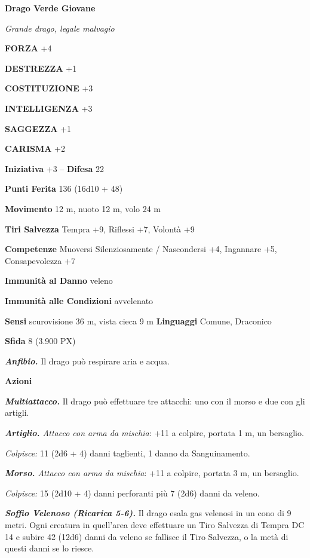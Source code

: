 \begin{multicols}{2}
	\medskip{}\textbf{Drago Verde Giovane}

	\textit{Grande drago, legale malvagio}

	\textbf{FORZA} +4

	\textbf{DESTREZZA} +1

	\textbf{COSTITUZIONE} +3

	\textbf{INTELLIGENZA} +3

	\textbf{SAGGEZZA} +1

	\textbf{CARISMA} +2

	\textbf{Iniziativa} +3 -- \textbf{Difesa} 22

	\textbf{Punti Ferita} 136 (16d10 + 48)

	\textbf{Movimento} 12 m, nuoto 12 m, volo 24 m

	\textbf{Tiri Salvezza} Tempra +9, Riflessi +7, Volontà +9

	\textbf{Competenze} Muoversi Silenziosamente / Nascondersi +4, Ingannare +5, Consapevolezza +7

	\textbf{Immunità al Danno} veleno

	\textbf{Immunità alle Condizioni} avvelenato

	\textbf{Sensi} scurovisione 36 m, vista cieca 9 m
	\textbf{Linguaggi} Comune, Draconico

	\textbf{Sfida} 8 (3.900 PX)

	\textit{\textbf{Anfibio.}} Il drago può respirare aria e acqua.

	\textbf{Azioni}

	\textit{\textbf{Multiattacco.}} Il drago può effettuare tre attacchi: uno con il morso e due con gli artigli.

	\textit{\textbf{Artiglio.} Attacco con arma da mischia}: +11 a colpire, portata 1 m, un bersaglio.

	\textit{Colpisce:} 11 (2d6 + 4) danni taglienti, 1 danno da Sanguinamento.

	\textit{\textbf{Morso.} Attacco con arma da mischia}: +11 a colpire, portata 3 m, un bersaglio.

	\textit{Colpisce:} 15 (2d10 + 4) danni perforanti più 7 (2d6) danni da veleno.

	\textit{\textbf{Soffio Velenoso (Ricarica 5-6).}} Il drago esala gas velenosi in un cono di 9 metri. Ogni creatura in quell'area deve effettuare un Tiro Salvezza di Tempra DC 14 e subire 42 (12d6) danni da veleno se fallisce il Tiro Salvezza, o la metà di questi danni se lo riesce.


\end{multicols}
